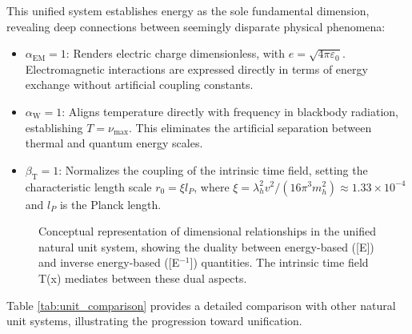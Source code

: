 \documentclass[12pt,a4paper]{article} %
\newcommand{\alphaEM}{\alpha_{\text{EM}}}
\newcommand{\alphaW}{\alpha_{\text{W}}}
\newcommand{\betaT}{\beta_{\text{T}}}
\begin{document}
	This unified system establishes energy as the sole fundamental dimension,
	revealing deep connections between seemingly disparate physical phenomena:
	\begin{itemize}
		\item \textbf{$\alphaEM = 1$}:
		Renders electric charge dimensionless,
		with $e = \sqrt{4\pi\varepsilon_0}$. 
		Electromagnetic interactions are expressed directly in terms of energy exchange
		without artificial coupling constants.
		\item \textbf{$\alphaW = 1$}:
		Aligns temperature directly with frequency in blackbody radiation,
		establishing $T = \nu_{\text{max}}$. 
		This eliminates the artificial separation between thermal and quantum energy scales.
		\item \textbf{$\betaT = 1$}:
		Normalizes the coupling of the intrinsic time field,
		setting the characteristic length scale $r_0 = \xi l_P$,
		where $\xi = \lambda_h^2v^2/(16\pi^3m_h^2) \approx 1.33 \times 10^{-4}$
		and $l_P$ is the Planck length.
	\end{itemize}
	
	\begin{figure}[ht]
		\centering
		\caption{Conceptual representation of dimensional relationships
			in the unified natural unit system,
			showing the duality between energy-based ([E])
			and inverse energy-based ([E$^{-1}$]) quantities.
			The intrinsic time field T(x) mediates between these dual aspects.}
		\label{fig:dimensions}
	\end{figure}
	
	Table \ref{tab:unit_comparison} provides a detailed comparison
	with other natural unit systems,
	illustrating the progression toward unification.
	
\end{document}
